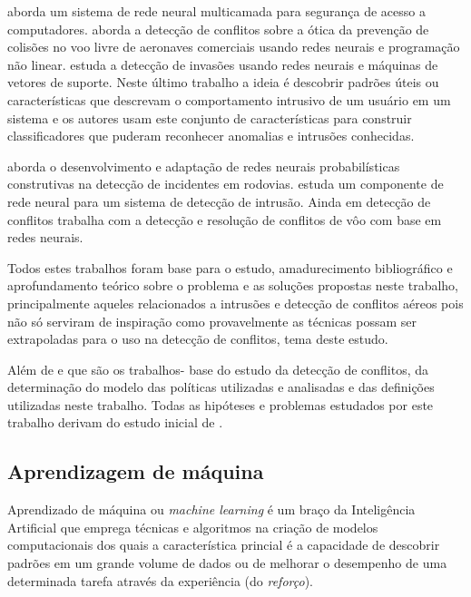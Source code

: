 \cite{obaidat_multilayer_1994} aborda um sistema de rede neural multicamada para segurança de acesso a computadores. \cite{christodoulou_collision_2008} aborda a detecção de conflitos sobre a ótica da prevenção de colisões no voo livre de aeronaves comerciais usando redes neurais e programação não linear. \cite{mukkamala_intrusion_2002} estuda a detecção de invasões usando redes neurais e máquinas de vetores de suporte. Neste último trabalho a ideia é descobrir padrões úteis ou características que descrevam o comportamento intrusivo de um usuário em um sistema e os autores usam este conjunto de características para construir classificadores que puderam reconhecer anomalias e intrusões conhecidas. 

\cite{jin_development_2002} aborda o desenvolvimento e adaptação de redes neurais probabilísticas construtivas na detecção de incidentes em rodovias. \cite{debar_neural_1992} estuda um componente de rede neural para um sistema de detecção de intrusão. Ainda em detecção de conflitos \cite{chen_flight_2011} trabalha com a detecção e resolução de conflitos de vôo com base em redes neurais.

Todos estes trabalhos foram base para o estudo, amadurecimento bibliográfico e aprofundamento teórico sobre o problema e as soluções propostas neste trabalho, principalmente aqueles relacionados a intrusões e detecção de conflitos aéreos pois não só serviram de inspiração como provavelmente as técnicas possam ser extrapoladas para o uso na detecção de conflitos, tema deste estudo.

Além de \cite{sarkis2017} e \cite{sarkis:artigo:2016} que são os trabalhos- base do estudo da detecção de conflitos, da determinação do modelo das políticas utilizadas e analisadas e das definições utilizadas neste trabalho. Todas as hipóteses e problemas estudados por este trabalho derivam do estudo inicial de \cite{sarkis2017}.

\subsection{Aprendizagem de máquina} \label{aprendizagem_maquina}
Aprendizado de máquina ou \textit{machine learning} é um braço da Inteligência Artificial que emprega técnicas e algoritmos na criação de modelos computacionais dos quais a característica princial é a capacidade de descobrir padrões em um grande volume de dados ou de melhorar o desempenho de uma determinada tarefa através da experiência (do \textit{reforço}).\cite{mohri_foundations_2018} \cite{alpaydin_introduction_2014} \cite{swamynathan_mastering_2019}

